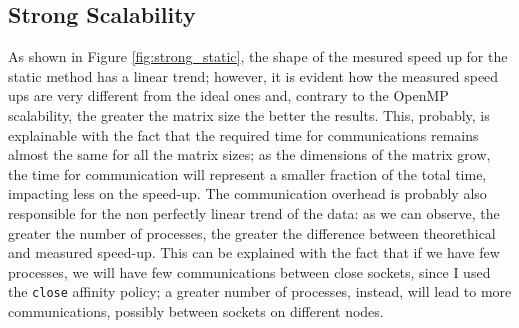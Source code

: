 \documentclass[12pt]{article}
\begin{document}
    \subsection{Strong Scalability}
    
    As shown in Figure \ref{fig:strong_static}, the shape of the mesured speed up for the static method has a linear trend; however, it is evident how the measured speed ups are very different from the ideal ones and, contrary to the OpenMP scalability, the greater the matrix size the better the results. This, probably, is explainable with the fact that the required time for communications remains almost the same for all the matrix sizes; as the dimensions of the matrix grow, the time for communication will represent a smaller fraction of the total time, impacting less on the speed-up.\newline
    The communication overhead is probably also responsible for the non perfectly linear trend of the data: as we can observe, the greater the number of processes, the greater the difference between theorethical and measured speed-up. This can be explained with the fact that if we have few processes, we will have few communications between close sockets, since I used the \lstinline|close| affinity policy; a greater number of processes, instead, will lead to more communications, possibly between sockets on different nodes.\newline
    
\end{document}
